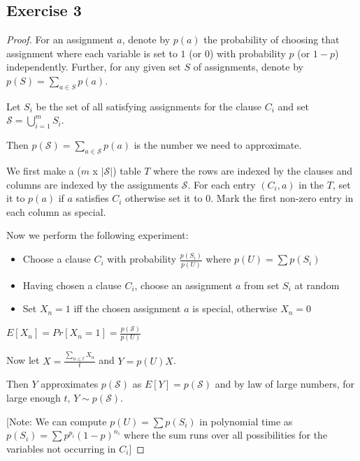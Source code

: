 \documentclass[12pt]{article}
\begin{document}
\subsection*{Exercise 3}
\begin{proof}
For an assignment $a$, denote by $p(a)$ the probability of choosing that assignment where each variable is set to $1$ (or $0$) with probability $p$ (or $1-p$) independently. Further, for any given set $S$ of assignments, denote by $p(S) = \sum_{a \in S} p(a)$.

Let $S_i$ be the set of all satisfying assignments for the clause $C_i$ and set $\mathcal{S} = \bigcup_{i=1}^m S_i$.

Then $p(\mathcal{S}) = \sum_{a \in \mathcal{S}} p(a)$ is the number we need to approximate.

We first make a ($m$ x $|\mathcal{S}|$) table $T$ where the rows are indexed by the clauses and columns are indexed by the assignments $\mathcal{S}$. For each entry $(C_i, a)$ in the $T$, set it to $p(a)$ if $a$ satisfies $C_i$ otherwise set it to $0$. Mark the first non-zero entry in each column as special.

Now we perform the following experiment:

\begin{itemize}
    \item Choose a clause $C_i$ with probability $\frac{p(S_i)}{p(U)}$ where $p(U) = \sum p(S_i)$
    \item Having chosen a clause $C_i$, choose an assignment $a$ from set $S_i$ at random
    \item Set $X_n = 1$ iff the chosen assignment $a$ is special, otherwise $X_n = 0$
\end{itemize}

$E[X_n] = Pr[X_n = 1] = \frac{p(\mathcal{S})}{p(U)}$

Now let $X = \frac{\sum_{n \leq t} X_n}{t}$ and $Y = p(U) X$.

Then $Y$ approximates $p(\mathcal{S})$ as $E[Y] = p(\mathcal{S})$ and by law of large numbers, for large enough $t$, $Y \sim p(\mathcal{S})$.

[Note: We can compute $p(U) = \sum p(S_i)$ in polynomial time as $p(S_i) = \sum p^{p_i}(1-p)^{n_i}$ where the sum runs over all possibilities for the variables not occurring in $C_i$]
\end{proof}
\end{document}
